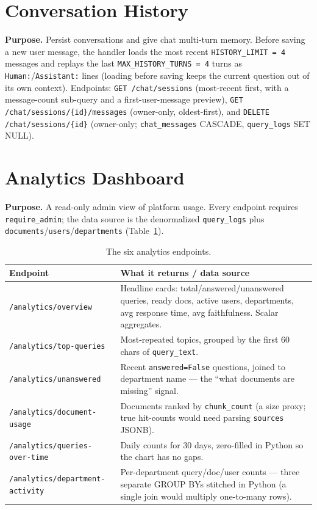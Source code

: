\documentclass[11pt,a4paper,oneside]{report}
\newcommand{\code}[1]{\texttt{#1}}
\begin{document}
\section{Conversation History}
\textbf{Purpose.} Persist conversations and give chat multi-turn memory. Before saving a new user
message, the handler loads the most recent \code{HISTORY\_LIMIT = 4} messages and replays the last
\code{MAX\_HISTORY\_TURNS = 4} turns as \code{Human:}/\code{Assistant:} lines (loading before saving
keeps the current question out of its own context). Endpoints: \code{GET /chat/sessions} (most-recent
first, with a message-count sub-query and a first-user-message preview),
\code{GET /chat/sessions/\{id\}/messages} (owner-only, oldest-first), and
\code{DELETE /chat/sessions/\{id\}} (owner-only; \code{chat\_messages} CASCADE, \code{query\_logs}
SET NULL).

\section{Analytics Dashboard}
\label{sec:analytics}
\textbf{Purpose.} A read-only admin view of platform usage. Every endpoint requires
\code{require\_admin}; the data source is the denormalized \code{query\_logs} plus
\code{documents}/\code{users}/\code{departments} (Table~\ref{tab:analytics}).

\begin{table}[htbp]
\centering
\caption{The six analytics endpoints.}
\label{tab:analytics}
\begin{tabularx}{\linewidth}{|l|X|}
\hline
\rowcolor{ink}
{\color{white}\textbf{Endpoint}} & {\color{white}\textbf{What it returns / data source}}\\
\hline
\code{/analytics/overview} & Headline cards: total/answered/unanswered queries, ready docs, active users, departments, avg response time, avg faithfulness. Scalar aggregates.\\ \hline
\code{/analytics/top-queries} & Most-repeated topics, grouped by the first 60 chars of \code{query\_text}.\\ \hline
\code{/analytics/unanswered} & Recent \code{answered=False} questions, joined to department name --- the ``what documents are missing'' signal.\\ \hline
\code{/analytics/document-usage} & Documents ranked by \code{chunk\_count} (a size proxy; true hit-counts would need parsing \code{sources} JSONB).\\ \hline
\code{/analytics/queries-over-time} & Daily counts for 30 days, zero-filled in Python so the chart has no gaps.\\ \hline
\code{/analytics/department-activity} & Per-department query/doc/user counts --- three separate GROUP BYs stitched in Python (a single join would multiply one-to-many rows).\\ \hline
\end{tabularx}
\end{table}
\end{document}
